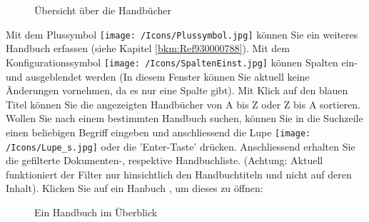 \begin{figure}[H]
\caption{Übersicht über die Handbücher}
\end{figure}

Mit dem Plussymbol \texttt{[image: /Icons/Plussymbol.jpg]}  können Sie ein weiteres Handbuch erfassen (siehe Kapitel \ref{bkm:Ref930000788}). Mit dem Konfigurationssymbol \texttt{[image: /Icons/SpaltenEinst.jpg]}  können Spalten ein- und ausgeblendet werden (In diesem Fenster können Sie aktuell keine Änderungen vornehmen, da es nur eine Spalte gibt). Mit Klick auf den blauen Titel  können Sie die angezeigten Handbücher von A bis Z oder Z bis A sortieren. Wollen Sie nach einem bestimmten Handbuch suchen, können Sie in die Suchzeile  einen beliebigen Begriff eingeben und anschliessend die Lupe \texttt{[image: /Icons/Lupe\_s.jpg]} oder die 'Enter-Taste' drücken. Anschliessend erhalten Sie die gefilterte Dokumenten-, respektive Handbuchliste. (Achtung: Aktuell funktioniert der Filter nur hinsichtlich den Handbuchtiteln und nicht auf deren Inhalt). Klicken Sie auf ein Hanbuch , um dieses zu öffnen:

\begin{figure}[H]
\caption{Ein Handbuch im Überblick}
\end{figure}

